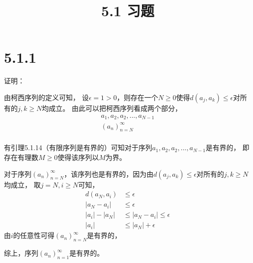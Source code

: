 \documentclass{article}
\theoremstyle{mystyle}
\begin{document}
\title{5.1 习题}
\maketitle

\section*{5.1.1}

证明：

由柯西序列的定义可知，
设$\epsilon = 1 > 0$，则存在一个$N \geq 0$使得$d(a_j,a_k) \leq \epsilon$对所有的$j,k \geq N$均成立。
由此可以把柯西序列看成两个部分，
\begin{align*}
  a_1,a_2,a_2,...,a_{N-1} \\
  (a_n)_{n=N}^\infty      \\
\end{align*}

有引理5.1.14（有限序列是有界的）可知对于序列$a_1,a_2,a_2,...,a_{N-1}$是有界的，
即存在有理数$M \geq 0$使得该序列以$M$为界。

对于序列$(a_n)_{n=N}^\infty$，该序列也是有界的，因为由$d(a_j,a_k) \leq \epsilon$对所有的$j,k \geq N$均成立，
取$j=N, i \geq N$可知，
\begin{align*}
  d(a_N,a_i)  & \leq \epsilon                  \\
  |a_N - a_i| & \leq \epsilon                  \\
  |a_i|-|a_N| & \leq |a_N - a_i| \leq \epsilon \\
  |a_i|       & \leq |a_N| + \epsilon
\end{align*}
由$i$的任意性可得$(a_n)_{n=N}^\infty$是有界的，

综上，序列$(a_n)_{n=1}^\infty$是有界的。
\end{document}
